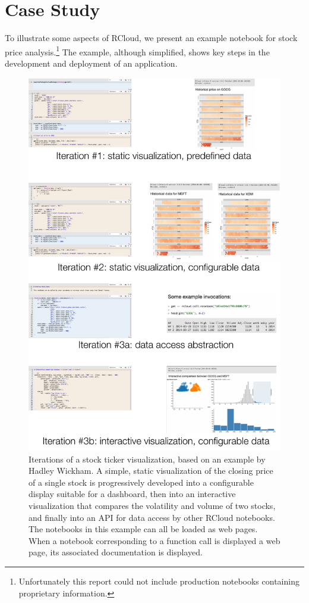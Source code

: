 \section{Case Study\label{sec:casestudy}}

To illustrate some aspects of RCloud, we present an example notebook
for stock price analysis.\footnote{Unfortunately this report could not
include production notebooks containing proprietary information.}
The example, although simplified, shows key steps in the development
and deployment of an application.

\begin{figure}
\includegraphics[width=\linewidth]{fig/casestudy1/casestudy1.pdf}
\caption{\label{fig:stockvis}Iterations of a stock ticker
  visualization, based on an example by Hadley Wickham. A
  simple, static visualization of the closing price of a single stock
  is progressively developed into a configurable display suitable
  for a dashboard, then into an interactive visualization that
  compares the volatility and volume of two stocks, and finally
  into an API for data access by other RCloud notebooks. The notebooks
  in this example can all be loaded as web pages. When a notebook
  corresponding to a function call is displayed a web page,
  its associated documentation is displayed.}
\end{figure}

